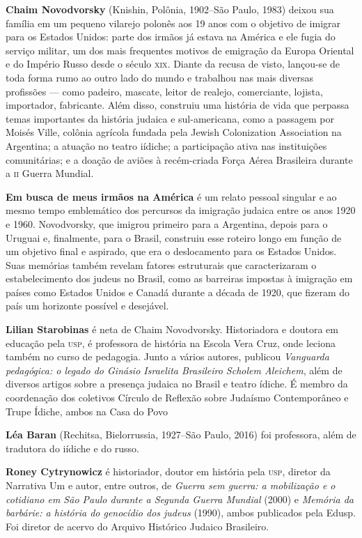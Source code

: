 \textbf{Chaim Novodvorsky} (Knishin, Polônia, 1902--São Paulo, 1983) deixou sua família em um pequeno vilarejo polonês aos 19 anos com o objetivo de imigrar para os Estados Unidos: parte dos irmãos já estava na América e ele fugia do serviço militar, um dos mais frequentes motivos de emigração da Europa Oriental e do Império Russo desde o século \textsc{xix}. Diante da recusa de visto, lançou-se de toda forma rumo ao outro lado do mundo e trabalhou nas mais diversas profissões --- como padeiro, mascate, leitor de realejo, comerciante, lojista, importador, fabricante. Além disso, construiu uma história de vida que perpassa temas importantes da história judaica e sul-americana, como a passagem por Moisés Ville, colônia agrícola fundada pela Jewish Colonization Association na Argentina; a atuação no teatro iídiche; a participação ativa nas instituições comunitárias; e a doação de aviões à recém-criada Força Aérea Brasileira durante a \textsc{ii} Guerra Mundial.

\textbf{Em busca de meus irmãos na América} é um relato pessoal singular e ao mesmo tempo emblemático dos percursos da imigração judaica entre os anos 1920 e 1960. Novodvorsky, que imigrou primeiro para a Argentina, depois para o Uruguai e, finalmente, para o Brasil, construiu esse roteiro longo em função de um objetivo final e aspirado, que era o deslocamento para os Estados Unidos. Suas memórias também revelam fatores estruturais que caracterizaram o estabelecimento dos judeus no Brasil, como as barreiras impostas à imigração em países como Estados Unidos e Canadá durante a década de 1920, que fizeram do país um horizonte possível e desejável.

\pagebreak

\textbf{Lilian Starobinas} é neta de Chaim Novodvorsky. Historiadora e doutora em educação pela \textsc{usp}, é professora de história na Escola Vera Cruz, onde leciona também no curso de pedagogia. Junto a vários autores, publicou \textit{Vanguarda pedagógica: o legado do Ginásio Israelita Brasileiro Scholem Aleichem}, além de diversos artigos sobre a presença judaica no Brasil e teatro ídiche. É membro da coordenação dos coletivos Círculo de Reflexão sobre Judaísmo Contemporâneo e Trupe Ídiche, ambos na Casa do Povo

\textbf{Léa Baran} (Rechitsa, Bielorrussia, 1927--São Paulo, 2016) foi professora, além de tradutora do iídiche e do russo.

\textbf{Roney Cytrynowicz} é historiador, doutor em história pela \textsc{usp}, diretor da Narrativa Um e autor, entre outros, de \textit{Guerra sem guerra: a mobilização e o cotidiano em São Paulo durante a Segunda Guerra Mundial} (2000) e \textit{Memória da barbárie: a história do genocídio dos judeus} (1990), ambos publicados pela Edusp. Foi diretor de acervo do Arquivo Histórico Judaico Brasileiro.





